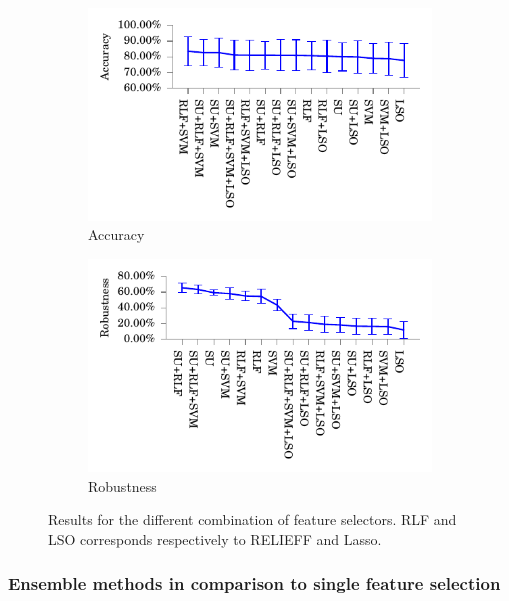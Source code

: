 \documentclass[twoside,11pt]{article}
\begin{document}
\begin{figure}
\centering
\begin{subfigure}{.5\textwidth}
  \centering
  \includegraphics[width=1.07\textwidth]{images/Accuracy_of_the_different_combinations.pdf}
  \caption{Accuracy}
  \label{fig:combination_accuracy}
\end{subfigure}%
\begin{subfigure}{.5\textwidth}
  \centering
  \includegraphics[width=1.07\textwidth]{images/Robustness_of_the_different_combinations.pdf}
  \caption{Robustness}
  \label{fig:combination_robustness}
\end{subfigure}
\caption{Results for the different combination of feature selectors. RLF and LSO corresponds respectively to RELIEFF and Lasso.}
\label{fig:combination_results}
\end{figure}

\subsubsection{Ensemble methods in comparison to single feature selection}
\end{document}
